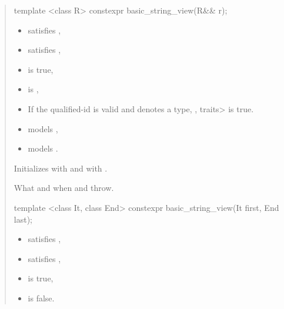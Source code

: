 \documentclass{wg21}
\begin{document}
\begin{quote}
\begin{addedblock}
\begin{itemdecl}
template <class R>
constexpr basic_string_view(R&& r);

\end{itemdecl}

\begin{itemdescr}
    \constraints
    \begin{itemize}
        \item {} satisfies ,
        \item {} satisfies ,
        \item {} is true,
        \item {} is ,
        \item If the qualified-id  is valid and denotes a type, , traits> is true.
    \end{itemize}
 
	\expects
	 \begin{itemize}
		\item {} models ,
		\item {} models .
	\end{itemize}

    \effects
    Initializes  with  and  with .


    \throws
    What and when  and  throw.



\end{itemdescr}

\begin{itemdecl}
template <class It, class End>
constexpr basic_string_view(It first, End last);

\end{itemdecl}

\begin{itemdescr}
    \constraints
    \begin{itemize}
        \item {} satisfies ,
        \item {} satisfies ,
        \item {} is true,
        \item {} is false.
    \end{itemize}


\end{itemdescr}
\end{addedblock}
\end{quote}
\end{document}
